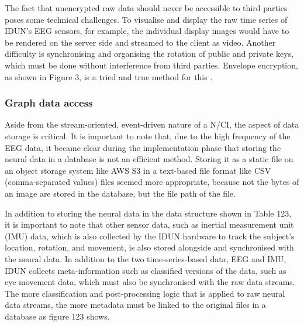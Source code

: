 
The fact that unencrypted raw data should never be accessible to third parties poses some technical challenges. To visualise and display the raw time series of IDUN's EEG sensors, for example, the individual display images would have to be rendered on the server side and streamed to the client as video. Another difficulty is synchronising and organising the rotation of public and private keys, which must be done without interference from third parties. Envelope encryption, as shown in Figure 3, is a tried and true method for this \citep{google_cloud_envelope_nodate}.


\subsubsection{Graph data access}
\label{chapter5-graph-data-access}

Aside from the stream-oriented, event-driven nature of a N/CI, the aspect of data storage is critical. It is important to note that, due to the high frequency of the EEG data, it became clear during the implementation phase that storing the neural data in a database is not an efficient method. Storing it as a static file on an object storage system like AWS S3 in a text-based file format like CSV (comma-separated values) files seemed more appropriate, because not the bytes of an image are stored in the database, but the file path of the file.


In addition to storing the neural data in the data structure shown in Table 123, it is important to note that other sensor data, such as inertial measurement unit (IMU) data, which is also collected by the IDUN hardware to track the subject's location, rotation, and movement, is also stored alongside and synchronised with the neural data. In addition to the two time-series-based data, EEG and IMU, IDUN collects meta-information such as classified versions of the data, such as eye movement data, which must also be synchronised with the raw data streams. The more classification and post-processing logic that is applied to raw neural data streams, the more metadata must be linked to the original files in a database as figure 123 shows.



